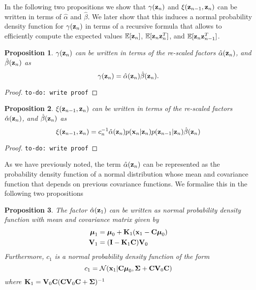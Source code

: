 \documentclass[11pt]{article}
\newtheorem{proposition}{Proposition}[section]
\begin{document}
In the following two propositions we show that $\gamma({\bf z}_n)$ and $\xi({\bf z}_{n-1}, {\bf z}_{n})$ can be written in terms of $\hat\alpha$ and $\hat\beta$. We later show that this induces a normal probability density function for $\gamma({\bf z}_n)$ in terms of a recursive formula that allows to efficiently compute the expected values $\mathbb{E}[{\bf z}_n]$, $\mathbb{E}[{\bf z}_n{\bf z}_{n}^{T}]$, and  $\mathbb{E}[{\bf z}_n{\bf z}_{n-1}^{T}]$.


\begin{proposition}
	$\gamma({\bf z}_n)$ can be written in terms of the re-scaled factors $\hat\alpha({\bf z}_n)$, and $\hat\beta({\bf z}_n)$ as
	\begin{equation}
		\gamma({\bf z}_n) = \hat\alpha({\bf z}_n)\hat\beta({\bf z}_n).
	\end{equation}
\end{proposition}

\begin{proof}
	\texttt{to-do: write proof}
\end{proof}

\begin{proposition}
	$\xi({\bf z}_{n-1}, {\bf z}_n)$ can be written in terms of the re-scaled factors $\hat\alpha({\bf z}_n)$, and $\hat\beta({\bf z}_n)$ as
	\begin{equation}
		\xi({\bf z}_{n-1}, {\bf z}_{n}) = c_n^{-1}\hat\alpha({\bf z}_n)p({\bf x}_n \vert {\bf z}_n) p({\bf z}_{n-1}\vert {\bf z}_n)\hat\beta({\bf z}_n)
	\end{equation}
\end{proposition}

\begin{proof}
	\texttt{to-do: write proof}
\end{proof}


As we have previously noted, the term $\hat\alpha({\bf z}_n)$ can be represented as the probability density function of a normal distribution whose mean and covariance function that depends on previous covariance functions. We formalise this in the following two propositions

\begin{proposition}
	The factor $\hat\alpha({\bf z}_1)$ can be written as normal probability density function with mean and covariance matrix given by
	\begin{align}
		\boldsymbol{\mu}_1 &= \boldsymbol{\mu}_0 + {\bf K}_1({\bf x}_1 -{\bf C}\boldsymbol\mu_0)\\
		{\bf V}_1 &=  ({\bf I} - {\bf K}_1{\bf C}){\bf V}_0
	\end{align}
	Furthermore, $c_1$ is a normal probability density function of the form
	\begin{equation}
		c_1 = \mathcal{N}({\bf x}_1\vert {\bf C}\boldsymbol\mu_0, \boldsymbol\Sigma + {\bf C} {\bf V}_0 {\bf C})
	\end{equation}
	where ${\bf K}_1 = {\bf V}_0{\bf C}({\bf C} {\bf V}_0 {\bf C} + \boldsymbol\Sigma)^{-1}$
\end{proposition}
\end{document}
